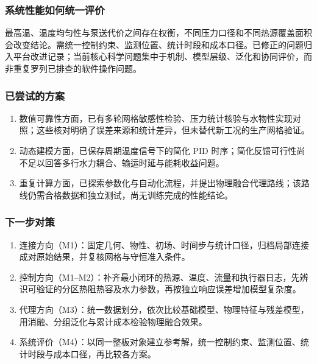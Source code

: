 \documentclass[UTF8]{midterm}
\begin{document}
\subsubsection{系统性能如何统一评价}
最高温、温度均匀性与泵送代价之间存在权衡，不同压力口径和不同热源覆盖面积会改变结论。需统一控制约束、监测位置、统计时段和成本口径。已修正的问题归入平台改进记录；当前核心科学问题集中于机制、模型层级、泛化和协同评价，而非重复罗列已排查的软件操作问题。

\subsubsection{已尝试的方案}
\begin{enumerate}
\item 数值可靠性方面，已有多轮网格敏感性检验、压力统计核验与水物性实现对照；这些核对明确了误差来源和统计差异，但未替代新工况的生产网格验证。
\item 动态建模方面，已保存周期温度信号下的简化 PID 时序；简化反馈可行性尚不足以回答多行水力耦合、输运时延与能耗收益问题。
\item 重复计算方面，已探索参数化与自动化流程，并提出物理融合代理路线；该路线仍需合格数据和独立测试，尚无训练完成的性能结论。
\end{enumerate}
\subsubsection{下一步对策}
\begin{enumerate}
\item 连接方向（M1）：固定几何、物性、初场、时间步与统计口径，归档局部连接成对原始结果，并复核网格与守恒准入条件。
\item 控制方向（M1--M2）：补齐最小闭环的热源、温度、流量和执行器日志，先辨识可验证的分区热阻热容及水力参数，再按独立响应误差增加模型复杂度。
\item 代理方向（M3）：统一数据划分，依次比较基础模型、物理特征与残差模型，用消融、分组泛化与累计成本检验物理融合效果。
\item 系统评价（M4）：以同一整板对象建立参考解，统一控制约束、监测位置、统计时段与成本口径，再比较各方案。
\end{enumerate}
\end{document}
